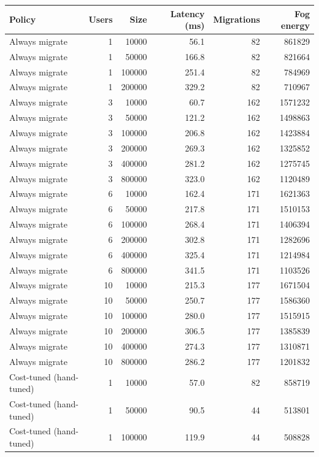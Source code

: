 \begin{table}[h]
\centering
\begin{tabular}{@{}lrrrrr@{}}
\toprule
Policy & Users & Size & Latency (ms) & Migrations & Fog energy \\
\midrule
Always migrate & 1 & 10000 & 56.1 & 82 & 861829 \\
Always migrate & 1 & 50000 & 166.8 & 82 & 821664 \\
Always migrate & 1 & 100000 & 251.4 & 82 & 784969 \\
Always migrate & 1 & 200000 & 329.2 & 82 & 710967 \\
Always migrate & 3 & 10000 & 60.7 & 162 & 1571232 \\
Always migrate & 3 & 50000 & 121.2 & 162 & 1498863 \\
Always migrate & 3 & 100000 & 206.8 & 162 & 1423884 \\
Always migrate & 3 & 200000 & 269.3 & 162 & 1325852 \\
Always migrate & 3 & 400000 & 281.2 & 162 & 1275745 \\
Always migrate & 3 & 800000 & 323.0 & 162 & 1120489 \\
Always migrate & 6 & 10000 & 162.4 & 171 & 1621363 \\
Always migrate & 6 & 50000 & 217.8 & 171 & 1510153 \\
Always migrate & 6 & 100000 & 268.4 & 171 & 1406394 \\
Always migrate & 6 & 200000 & 302.8 & 171 & 1282696 \\
Always migrate & 6 & 400000 & 325.4 & 171 & 1214984 \\
Always migrate & 6 & 800000 & 341.5 & 171 & 1103526 \\
Always migrate & 10 & 10000 & 215.3 & 177 & 1671504 \\
Always migrate & 10 & 50000 & 250.7 & 177 & 1586360 \\
Always migrate & 10 & 100000 & 280.0 & 177 & 1515915 \\
Always migrate & 10 & 200000 & 306.5 & 177 & 1385839 \\
Always migrate & 10 & 400000 & 274.3 & 177 & 1310871 \\
Always migrate & 10 & 800000 & 286.2 & 177 & 1201832 \\
Cost-tuned (hand-tuned) & 1 & 10000 & 57.0 & 82 & 858719 \\
Cost-tuned (hand-tuned) & 1 & 50000 & 90.5 & 44 & 513801 \\
Cost-tuned (hand-tuned) & 1 & 100000 & 119.9 & 44 & 508828 \\

\end{tabular}
\end{table}
